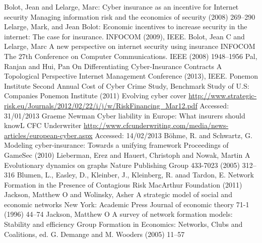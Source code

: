 \documentclass{llncs}
\begin{document}

%
\begin{thebibliography}{[MT1]}
%
 Bolot, Jean and Lelarge, Marc:
 Cyber insurance as an incentive for Internet security
 Managing information risk and the economics of security
 (2008) 269--290
%
	Lelarge, Mark, and Jean Bolot:
	Economic incentives to increase security in the internet: The case for insurance.
	INFOCOM (2009), IEEE.
%
	Bolot, Jean C and Lelarge, Marc
	A new perspective on internet security using insurance
	INFOCOM The 27th Conference on Computer Communications. IEEE
	(2008) 1948--1956
	Pal, Ranjan and Hui, Pan	
	On Differentiating Cyber-Insurance Contracts A Topological Perspective
 	Internet Management Conference (2013), IEEE.
%
Ponemon Institute
Second Annual Cost of Cyber Crime Study, Benchmark Study of U.S: Companies
Ponemon Institute (2011)
%
 Evolving cyber cover
 \url{http://www.strategic-risk.eu/Journals/2012/02/22/i/j/w/RiskFinancing_Mar12.pdf}
 Accessed: 31/01/2013
	Graeme Newman
	Cyber liability in Europe: What insurers should knowL
	CFC Underwriter \url{http://www.cfcunderwriting.com/media/news-articles/european-cyber.aspx}
	Accessed: 14/02/2013
 B{\"o}hme, R. and Schwartz, G.
 Modeling cyber-insurance: Towards a unifying framework
 Proceedings of GameSec (2010)
%
Lieberman, Erez and Hauert, Christoph and Nowak, Martin A
Evolutionary dynamics on graphs
Nature Publishing Group 433-7023 (2005) 312--316
%
Blumen, L., Easley, D., Kleinber, J.,  Kleinberg, R. anad Tardon, E.
Network Formation in the Presence of Contagious Risk
MacArthur Foundation (2011)
Jackson, Matthew O and Wolinsky, Asher
A strategic model of social and economic networks
New York: Academic Press Journal of economic theory 71-1 (1996) 44--74
%
Jackson, Matthew O
A survey of network formation models: Stability and efficiency
Group Formation in Economics: Networks, Clubs and Coalitions, ed. G. Demange and M. Wooders (2005) 11--57


\end{thebibliography}
%
\end{document}
